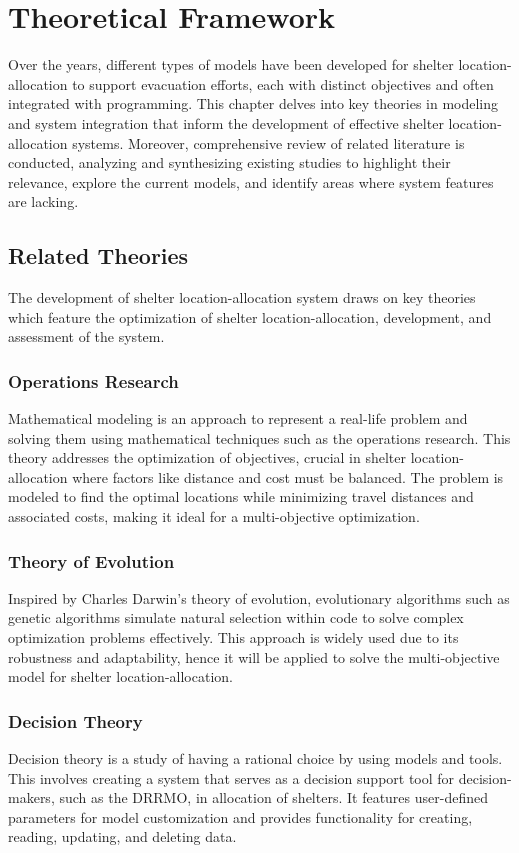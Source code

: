 \chapter{Theoretical Framework}
	Over the years, different types of models have been developed for shelter location-allocation to support evacuation efforts, each with distinct objectives and often integrated with programming. This chapter delves into key theories in modeling and system integration that inform the development of effective shelter location-allocation systems. Moreover, comprehensive review of related literature is conducted, analyzing and synthesizing existing studies to highlight their relevance, explore the current models, and identify areas where system features are lacking. 

\section{Related Theories}
	The development of shelter location-allocation system draws on key theories which feature the optimization of shelter location-allocation, development, and assessment of the system.

\subsection{Operations Research}
 	Mathematical modeling is an approach to represent a real-life problem and solving them using mathematical techniques such as the operations research. This theory addresses the optimization of objectives, crucial in shelter location-allocation where factors like distance and cost must be balanced. The problem is modeled to find the optimal locations while minimizing travel distances and associated costs, making it ideal for a multi-objective optimization.

\subsection{Theory of Evolution}
	Inspired by Charles Darwin’s theory of evolution, evolutionary algorithms such as genetic algorithms simulate natural selection within code to solve complex optimization problems effectively. This approach is widely used due to its robustness and adaptability, hence it will be applied to solve the multi-objective model for shelter location-allocation.

\subsection{Decision Theory}
 	Decision theory is a study of having a rational choice by using models and tools. This involves creating a system that serves as a decision support tool for decision-makers, such as the DRRMO, in allocation of shelters. It features user-defined parameters for model customization and provides functionality for creating, reading, updating, and deleting data.
 	
